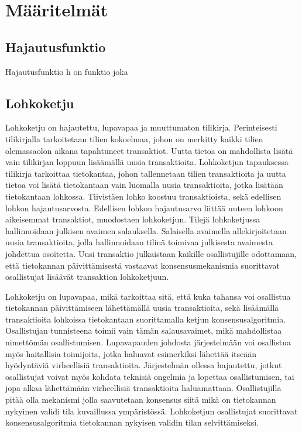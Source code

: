 \chapter{Määritelmät\label{methods}}

\section{Hajautusfunktio}
Hajautusfunktio h on funktio joka 

\section{Lohkoketju}

Lohkoketju on hajautettu, lupavapaa ja muuttumaton tilikirja. Perinteisesti tilikirjalla tarkoitetaan tilien kokoelmaa, johon on merkitty kaikki tilien olemassaolon aikana tapahtuneet transaktiot. Uutta tietoa on mahdollista lisätä vain tilikirjan loppuun lisäämällä uusia transaktioita. Lohkoketjun tapauksessa tilikirja tarkoittaa tietokantaa, johon tallennetaan tilien transaktioita ja uutta tietoa voi lisätä tietokantaan vain luomalla uusia transaktioita, jotka lisätään tietokantaan lohkossa. Tiivistäen lohko koostuu transaktioista, sekä edellisen lohkon hajautusarvosta. Edellisen lohkon hajautusarvo liittää uuteen lohkoon aikeisemmat transaktiot, muodostaen lohkoketjun. Tilejä lohkoketjussa hallinnoidaan julkisen avaimen salauksella. Salaisella avaimella allekirjoitetaan uusia transaktioita, jolla hallinnoidaan tilinä toimivaa julkisesta avaimesta johdettua osoitetta. Uusi transaktio julkaistaan kaikille osallistujille odottamaan, että tietokannan päivittämisestä vastaavat konsensusmekanismia suorittavat osallistujat lisäävät transaktion lohkoketjuun.

Lohkoketju on lupavapaa, mikä tarkoittaa sitä, että kuka tahansa voi osallistua tietokannan päivittämiseen lähettämällä uusia transaktioita, sekä lisäämällä transaktioita lohkoissa tietokantaan suorittamalla ketjun konsensusalgoritmia. Osallistujan tunnisteena toimii vain tämän salausavaimet, mikä mahdollistaa nimettömän osallistumisen. Lupavapauden johdosta järjestelmään voi osallistua myös haitallisia toimijoita, jotka haluavat esimerkiksi lähettää itseään hyödyntäviä virheellisiä transaktioita. Järjestelmän ollessa hajautettu, jotkut osallistujat voivat myös kohdata teknisiä ongelmia ja lopettaa osallistumisen, tai jopa alkaa lähettämään virheellisiä transaktioita haluamattaan. Osallistujilla pitää olla mekanismi jolla saavutetaan konsensus siitä mikä on tietokannan nykyinen validi tila kuvaillussa ympäristössä. Lohkoketjun osallistujat suorittavat konsensusalgoritmia tietokannan nykyisen validin tilan selvittämiseksi. 

